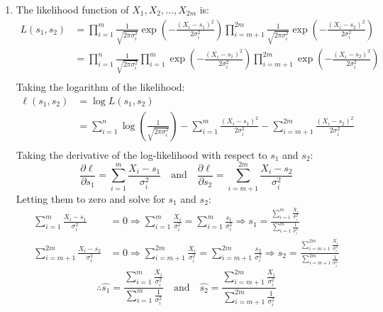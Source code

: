 \documentclass{article}
\begin{document}
\begin{enumerate}
\begin{enumerate}[label=(\roman*)]
    \item The likelihood function of $X_1, X_2, \dots, X_{2m}$ is:
    \begin{align*}
    L(s_1, s_2) &= \prod_{i=1}^{m} \frac{1}{\sqrt{2\pi \sigma_i^2}} \exp\left( -\frac{(X_i - s_1)^2}{2\sigma_i^2} \right) \prod_{i=m+1}^{2m} \frac{1}{\sqrt{2\pi \sigma_i^2}} \exp\left( -\frac{(X_i - s_2)^2}{2\sigma_i^2} \right) \\
    &= \prod_{i=1}^{n} \frac{1}{\sqrt{2\pi \sigma_i^2}} \prod_{i=1}^{m} \exp\left( -\frac{(X_i - s_1)^2}{2\sigma_i^2} \right) \prod_{i=m+1}^{2m} \exp\left( -\frac{(X_i - s_2)^2}{2\sigma_i^2} \right) \\
    \end{align*}
    Taking the logarithm of the likelihood:
    \begin{align*}
    \ell(s_1, s_2) &= \log L(s_1, s_2) \\
    &= \sum_{i=1}^n \log \left( \frac{1}{\sqrt{2\pi \sigma_i^2}} \right) - \sum_{i=1}^{m} \frac{(X_i - s_1)^2}{2\sigma_i^2} - \sum_{i=m+1}^{2m} \frac{(X_i - s_2)^2}{2\sigma_i^2} \\
    \end{align*}
    Taking the derivative of the log-likelihood with respect to $s_1$ and $s_2$:
    \[
    \frac{\partial \ell}{\partial s_1} = \sum_{i=1}^{m} \frac{X_i - s_1}{\sigma_i^2} \quad \text{and} \quad \frac{\partial \ell}{\partial s_2} = \sum_{i=m+1}^{2m} \frac{X_i - s_2}{\sigma_i^2}
    \]
    Letting them to zero and solve for $s_1$ and $s_2$:
    \begin{align*}
    \sum_{i=1}^{m} \frac{X_i - s_1}{\sigma_i^2} &= 0 \Rightarrow \sum_{i=1}^{m} \frac{X_i}{\sigma_i^2} = \sum_{i=1}^{m} \frac{s_1}{\sigma_i^2} \Rightarrow s_1 = \frac{\sum_{i=1}^{m} \frac{X_i}{\sigma_i^2}}{\sum_{i=1}^{m} \frac{1}{\sigma_i^2}} \\
    \sum_{i=m+1}^{2m} \frac{X_i - s_2}{\sigma_i^2} &= 0 \Rightarrow \sum_{i=m+1}^{2m} \frac{X_i}{\sigma_i^2} = \sum_{i=m+1}^{2m} \frac{s_2}{\sigma_i^2} \Rightarrow s_2 = \frac{\sum_{i=m+1}^{2m} \frac{X_i}{\sigma_i^2}}{\sum_{i=m+1}^{2m} \frac{1}{\sigma_i^2}}
    \end{align*}
    \[
    \therefore \hat{s_1} = \frac{\sum_{i=1}^{m} \frac{X_i}{\sigma_i^2}}{\sum_{i=1}^{m} \frac{1}{\sigma_i^2}} \quad \text{and} \quad \hat{s_2} = \frac{\sum_{i=m+1}^{2m} \frac{X_i}{\sigma_i^2}}{\sum_{i=m+1}^{2m} \frac{1}{\sigma_i^2}}
    \]


\end{enumerate}
\end{enumerate}
\end{document}
